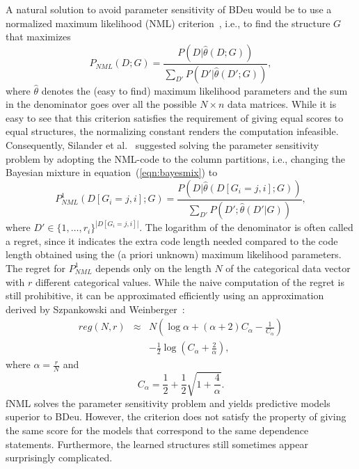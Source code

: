 A natural solution to avoid parameter sensitivity of BDeu would be to
use a normalized maximum likelihood (NML)
criterion~\cite{Shta87,Riss96a}, i.e., to find the structure $G$ that
maximizes
\begin{equation}
P_{NML}(D;G)=\frac{P(D|\hat\theta(D;G))}{\sum_{D'}{P(D'|\hat\theta(D';G))}},
\end{equation}
where $\hat\theta$ denotes the (easy to find) maximum likelihood
parameters and the sum in the denominator goes over all the possible
$N\times n$ data matrices. While it is easy to see that this criterion
satisfies the requirement of giving equal scores to equal structures,
the normalizing constant renders the computation
infeasible. Consequently, Silander et al.~\cite{cosco.pgm08a}
suggested solving the parameter sensitivity problem by adopting the
NML-code to the column partitions, i.e., changing the Bayesian mixture
in equation~(\ref{eqn:bayesmix}) to
\begin{equation}
P^1_{NML}(D[G_i=j,i];G)=\frac{P(D|\hat\theta(D[G_i=j,i];G))}{\sum_{D'}{P(D';\hat\theta(D'|G))}},
\end{equation}
where $D'\in{\{1,\ldots,r_i\}}^{|D[G_i=j,i]|}$.  The logarithm of the
denominator is often called a regret, since it indicates the extra
code length needed compared to the code length obtained using the (a
priori unknown) maximum likelihood parameters. The regret for
$P^1_{NML}$ depends only on the length $N$ of the categorical data
vector with $r$ different categorical values.  While the naive
computation of the regret is still prohibitive, it can be approximated
efficiently using an approximation derived by Szpankowski and
Weinberger~\cite{Szpankowski2012}:
\begin{eqnarray}
    reg(N, r) & \approx & N\left(\log{\alpha} + (\alpha + 2)C_\alpha -
                \frac{1}{C_\alpha}\right)\nonumber \\
    && - \frac{1}{2} \log{\left(C_\alpha + \frac{2}{\alpha}\right)},
\end{eqnarray}
where $\alpha = \frac{r}{N}$ and
\begin{equation}
    C_\alpha = \frac{1}{2} + \frac{1}{2} \sqrt{1 + \frac{4}{\alpha}}.
\end{equation}
fNML solves the parameter sensitivity problem and yields predictive
models superior to BDeu.  However, the criterion does not satisfy the
property of giving the same score for the models that correspond to
the same dependence statements. Furthermore, the learned structures
still sometimes appear surprisingly complicated.

